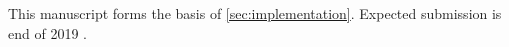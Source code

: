 This manuscript forms the basis of \cref{sec:implementation}. Expected submission is end of 2019 \citep{Denker_elephant_2019}.




